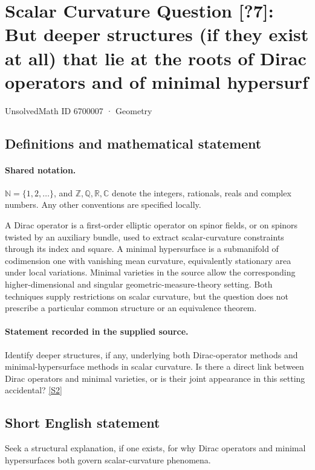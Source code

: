 \documentclass[11pt]{article}
\newcommand{\sref}[2]{\hyperlink{source:#1:#2}{[S#2]}}
\begin{document}
\setcounter{section}{6700006}
\section{Scalar Curvature Question [?7]: But deeper structures (if they exist at all) that lie at the roots of Dirac operators and of minimal hypersurf}\label{6700007}
{\small\sffamily UnsolvedMath ID 6700007 · Geometry}
\subsection{Definitions and mathematical statement}

\paragraph{Shared notation.}$\mathbb N=\{1,2,\ldots\}$, and $\mathbb Z,\mathbb Q,\mathbb R,\mathbb C$ denote the integers, rationals, reals and complex numbers. Any other conventions are specified locally.


A Dirac operator is a first-order elliptic operator on spinor fields, or on spinors twisted by an auxiliary bundle, used to extract scalar-curvature constraints through its index and square. A minimal hypersurface is a submanifold of codimension one with vanishing mean curvature, equivalently stationary area under local variations. Minimal varieties in the source allow the corresponding higher-dimensional and singular geometric-measure-theory setting. Both techniques supply restrictions on scalar curvature, but the question does not prescribe a particular common structure or an equivalence theorem.
\paragraph{Statement recorded in the supplied source.}
Identify deeper structures, if any, underlying both Dirac-operator methods and minimal-hypersurface methods in scalar curvature. Is there a direct link between Dirac operators and minimal varieties, or is their joint appearance in this setting accidental? \sref{6700007}{2}
\subsection{Short English statement}
Seek a structural explanation, if one exists, for why Dirac operators and minimal hypersurfaces both govern scalar-curvature phenomena.
\end{document}
